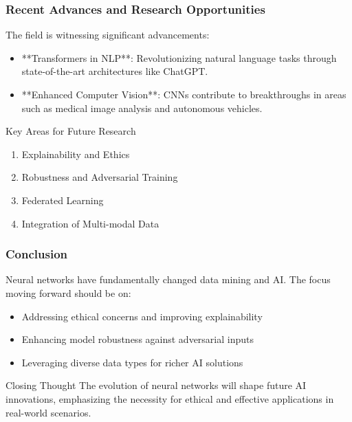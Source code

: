 \documentclass[aspectratio=169]{beamer}
\begin{document}
\begin{frame}[fragile]
    \frametitle{Recent Advances and Research Opportunities}
    The field is witnessing significant advancements:
    
    \begin{itemize}
        \item **Transformers in NLP**: Revolutionizing natural language tasks through state-of-the-art architectures like ChatGPT.
        
        \item **Enhanced Computer Vision**: CNNs contribute to breakthroughs in areas such as medical image analysis and autonomous vehicles.
    \end{itemize}

    \begin{block}{Key Areas for Future Research}
        \begin{enumerate}
            \item Explainability and Ethics
            \item Robustness and Adversarial Training
            \item Federated Learning
            \item Integration of Multi-modal Data
        \end{enumerate}
    \end{block}
\end{frame}

\begin{frame}[fragile]
    \frametitle{Conclusion}
    Neural networks have fundamentally changed data mining and AI. The focus moving forward should be on:
    
    \begin{itemize}
        \item Addressing ethical concerns and improving explainability
        \item Enhancing model robustness against adversarial inputs
        \item Leveraging diverse data types for richer AI solutions
    \end{itemize}
    
    \begin{block}{Closing Thought}
        The evolution of neural networks will shape future AI innovations, emphasizing the necessity for ethical and effective applications in real-world scenarios.
    \end{block}
\end{frame}
\end{document}
